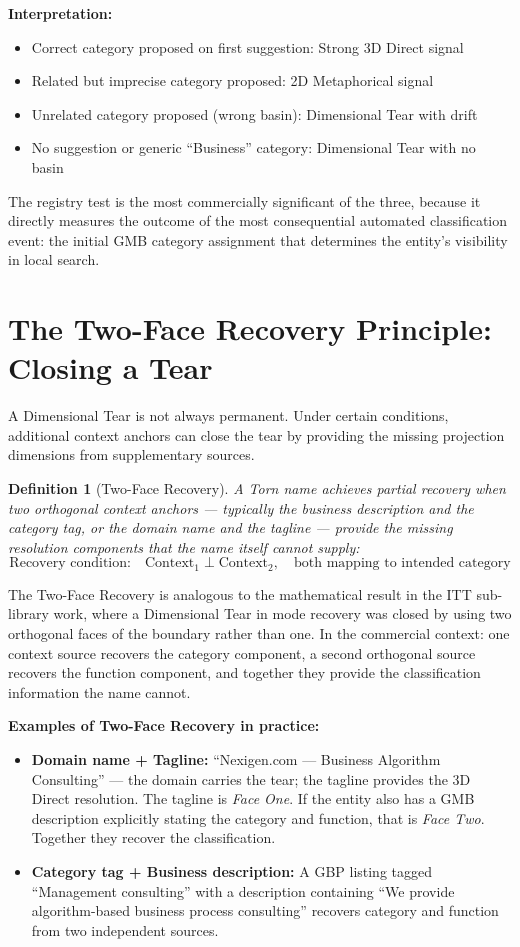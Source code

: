 \documentclass[12pt, openany]{book}
\theoremstyle{thmstyle}
\theoremstyle{defstyle}
\newtheorem{definition}{Definition}[chapter]
\begin{document}
\textbf{Interpretation:}
\begin{itemize}[leftmargin=1.5em]
  \item Correct category proposed on first suggestion: Strong 3D Direct signal
  \item Related but imprecise category proposed: 2D Metaphorical signal
  \item Unrelated category proposed (wrong basin): Dimensional Tear with drift
  \item No suggestion or generic ``Business'' category: Dimensional Tear with no basin
\end{itemize}

The registry test is the most commercially significant of the three, because it directly measures the outcome of the most consequential automated classification event: the initial GMB category assignment that determines the entity's visibility in local search.

\section{The Two-Face Recovery Principle: Closing a Tear}

A Dimensional Tear is not always permanent. Under certain conditions, additional context anchors can close the tear by providing the missing projection dimensions from supplementary sources.

\begin{definition}[Two-Face Recovery]
A Torn name achieves partial recovery when two orthogonal context anchors --- typically the business description and the category tag, or the domain name and the tagline --- provide the missing resolution components that the name itself cannot supply:
\[
\text{Recovery condition:} \quad \text{Context}_1 \perp \text{Context}_2, \quad \text{both mapping to intended category}
\]
\end{definition}

The Two-Face Recovery is analogous to the mathematical result in the ITT sub-library work, where a Dimensional Tear in mode recovery was closed by using two orthogonal faces of the boundary rather than one. In the commercial context: one context source recovers the category component, a second orthogonal source recovers the function component, and together they provide the classification information the name cannot.

\textbf{Examples of Two-Face Recovery in practice:}
\begin{itemize}[leftmargin=1.5em]
  \item \textbf{Domain name + Tagline:} ``Nexigen.com --- Business Algorithm Consulting'' --- the domain carries the tear; the tagline provides the 3D Direct resolution. The tagline is \textit{Face One}. If the entity also has a GMB description explicitly stating the category and function, that is \textit{Face Two}. Together they recover the classification.
  \item \textbf{Category tag + Business description:} A GBP listing tagged ``Management consulting'' with a description containing ``We provide algorithm-based business process consulting'' recovers category and function from two independent sources.
\end{itemize}
\end{document}

